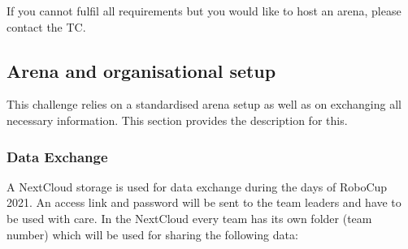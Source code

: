 If you cannot fulfil all requirements but you would like to host an arena, please contact the TC.

\subsection{Arena and organisational setup}
This challenge relies on a standardised arena setup as well as on exchanging all necessary information. This section provides the description for this.

\subsubsection{Data Exchange}
A NextCloud storage is used for data exchange during the days of RoboCup 2021. An access link and password will be sent to the team leaders and have to be used with care. In the NextCloud every team has its own folder (team number) which will be used for sharing the following data:

